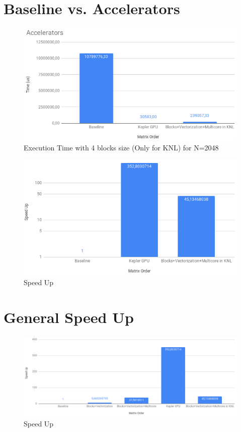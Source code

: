 \documentclass{article}
\begin{document}
\begin{appendices}
\section{Baseline vs. Accelerators}
\begin{figure}[H]
    \centering
    \includegraphics[width=15cm]{Pictures/exeTimeAcc.png}
    \caption{Execution Time with 4 blocks size (Only for KNL) for N=2048}
    \label{fig:exeTimeAcc}
\end{figure}

\begin{figure}[H]
    \centering
    \includegraphics[width=15cm]{Pictures/speedUpAcc.png}
    \caption{Speed Up}
    \label{fig:speedUpAcc}
\end{figure}

\section{General Speed Up}
\begin{figure}[H]
    \centering
    \includegraphics[width=15cm]{Pictures/generalSpeedUp.png}
    \caption{Speed Up}
    \label{fig:generalSpeedUp}
\end{figure}

\end{appendices}
\end{document}
